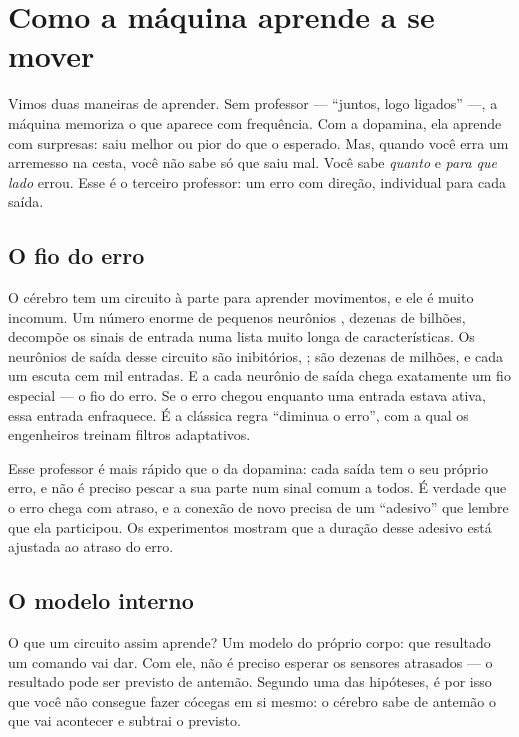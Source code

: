 \chapter{Como a máquina aprende a se mover}

Vimos duas maneiras de aprender. Sem professor --- ``juntos, logo ligados'' ---, a máquina memoriza o que aparece com frequência. Com a dopamina, ela aprende com surpresas: saiu melhor ou pior do que o esperado. Mas, quando você erra um arremesso na cesta, você não sabe só que saiu mal. Você sabe \emph{quanto} e \emph{para que lado} errou. Esse é o terceiro professor: um erro com direção, individual para cada saída.

\section*{O fio do erro}

O cérebro tem um circuito à parte para aprender movimentos, e ele é muito incomum. Um número enorme de pequenos neurônios , dezenas de bilhões, decompõe os sinais de entrada numa lista muito longa de características. Os neurônios de saída desse circuito são inibitórios, ; são dezenas de milhões, e cada um escuta cem mil entradas. E a cada neurônio de saída chega exatamente um fio especial --- o fio do erro. Se o erro chegou enquanto uma entrada estava ativa, essa entrada enfraquece. É a clássica regra ``diminua o erro'', com a qual os engenheiros treinam filtros adaptativos.


Esse professor é mais rápido que o da dopamina: cada saída tem o seu próprio erro, e não é preciso pescar a sua parte num sinal comum a todos. É verdade que o erro chega com atraso, e a conexão de novo precisa de um ``adesivo'' que lembre que ela participou. Os experimentos mostram que a duração desse adesivo está ajustada ao atraso do erro.

\section*{O modelo interno}

O que um circuito assim aprende? Um modelo do próprio corpo: que resultado um comando vai dar. Com ele, não é preciso esperar os sensores atrasados --- o resultado pode ser previsto de antemão. Segundo uma das hipóteses, é por isso que você não consegue fazer cócegas em si mesmo: o cérebro sabe de antemão o que vai acontecer e subtrai o previsto.

